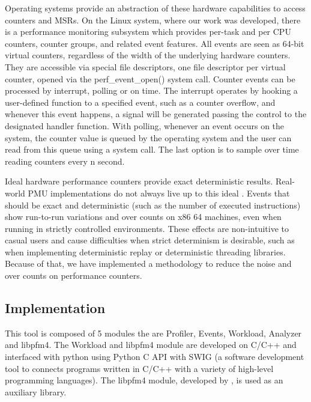 Operating systems provide an abstraction of these hardware capabilities to access counters and MSRs. 
On the Linux system, where our work was developed, there is a performance monitoring subsystem which provides per-task and per CPU counters, counter groups, and related event features. 
All events are seen as 64-bit virtual counters, regardless of the width of the underlying hardware counters. 
They are accessible via special file descriptors, one file descriptor per virtual counter, opened via the perf\_event\_open() system call.  %
Counter events can be processed by interrupt, polling or on time. The interrupt operates by hooking a user-defined function to a specified event, such as a counter overflow, and whenever this event happens, a signal will be generated passing the control to the designated handler function. With polling, whenever an event occurs on the system, the counter value is queued by the operating system and the user can read from this queue using a system call. The last option is to sample over time reading counters every n second.

Ideal hardware performance counters provide exact deterministic results. Real-world PMU implementations do not always live up to this ideal \cite{Weaver2008CanTrusted, Weaver2013Non-determinismImplementations, Das2019SoK:Security, McGuire2009AnalysisKernel}. Events that should be exact and deterministic (such as the number of executed instructions) show run-to-run variations and over counts on x86 64 machines, even when running in strictly controlled environments. 
These effects are non-intuitive to casual users and cause difficulties when strict determinism is desirable, such as when implementing deterministic replay or deterministic threading libraries. 
Because of that, we have implemented a methodology to reduce the noise and over counts on performance counters.


\subsection{Implementation}


This tool is composed of 5 modules the are Profiler, Events, Workload, Analyzer and libpfm4. 
The Workload and libpfm4 module are developed on C/C++ and interfaced with python using Python C API with SWIG (a software development tool to connects programs written in C/C++ with a variety of high-level programming languages). 
The libpfm4 module, developed by \cite{Eranian2008Perfmon2}, is used as an auxiliary library.

